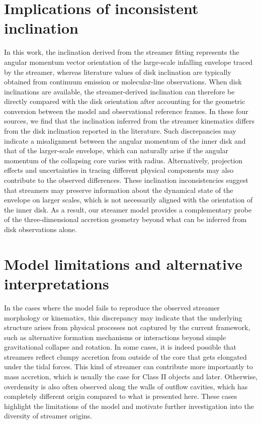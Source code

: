 \section{Implications of inconsistent inclination}
In this work, the inclination derived from the streamer fitting represents the angular momentum vector orientation of the large-scale infalling envelope traced by the streamer, whereas literature values of disk inclination are typically obtained from continuum emission or molecular-line observations. When disk inclinations are available, the streamer-derived inclination can therefore be directly compared with the disk orientation after accounting for the geometric conversion between the model and observational reference frames. In these four sources, we find that the inclination inferred from the streamer kinematics differs from the disk inclination reported in the literature. Such discrepancies may indicate a misalignment between the angular momentum of the inner disk and that of the larger-scale envelope, which can naturally arise if the angular momentum of the collapsing core varies with radius. Alternatively, projection effects and uncertainties in tracing different physical components may also contribute to the observed differences. These inclination inconsistencies suggest that streamers may preserve information about the dynamical state of the envelope on larger scales, which is not necessarily aligned with the orientation of the inner disk. As a result, our streamer model provides a complementary probe of the three-dimensional accretion geometry beyond what can be inferred from disk observations alone.

\section{Model limitations and alternative interpretations}
In the cases where the model fails to reproduce the observed streamer morphology or kinematics, this discrepancy may indicate that the underlying structure arises from physical processes not captured by the current framework, such as alternative formation mechanisms or interactions beyond simple gravitational collapse and rotation. In some cases, it is indeed possible that streamers reflect clumpy accretion from outside of the core that gets elongated under the tidal forces. This kind of streamer can contribute more importantly to mass accretion, which is usually the case for Class II objects and later. Otherwise, overdensity is also often observed along the walls of outflow cavities, which has completely different origin compared to what is presented here. These cases highlight the limitations of the model and motivate further investigation into the diversity of streamer origins.

